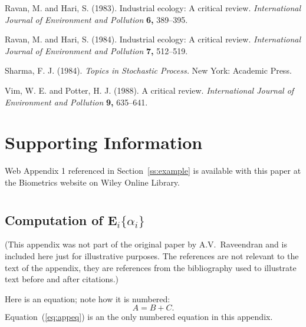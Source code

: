 \documentclass[useAMS,usenatbib]{biom}
\begin{document}
\begin{thebibliography}{}
 Ravan,
M. and Hari, S. (1983). Industrial ecology: A  critical review.
{\it International Journal of Environment and Pollution} {\bf 6,} 389--395.

Ravan, M. and Hari, S. (1984). Industrial ecology: A  critical
review. {\it International Journal of Environment and Pollution} {\bf 7,} 512--519.

 Sharma,
F. J. (1984). {\it Topics in Stochastic Process.} New York: Academic Press.

 Vim, W.
E. and Potter, H. J. (1988). A  critical
review. {\it International Journal of Environment and Pollution} {\bf 9,} 635--641.

\end{thebibliography}

\section*{Supporting Information}

Web Appendix 1 referenced in Section~\ref{ss:example} is available
with this paper at the Biometrics website on Wiley Online Library.
\vspace*{-8pt}


\appendix

\section{}
\subsection{Computation of E$_i\{\alpha_i\}$}

(This appendix was not part of the original paper by
A.V.~Raveendran and is included here just for illustrative
purposes. The references are not relevant to the text of the
appendix, they are references from the bibliography used to
illustrate text before and after citations.)

Here is an equation; note how it is numbered:
\begin{equation}
A = B+C. 
\label{eq:appeq}
\end{equation}
Equation~(\ref{eq:appeq}) is an the only numbered equation in this appendix.
\end{document}
